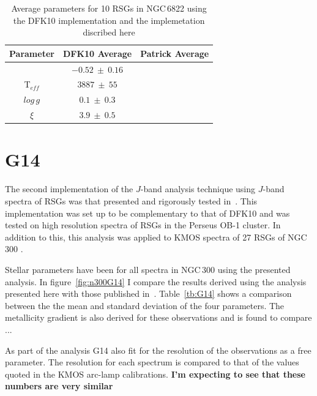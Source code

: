 \begin{table}
\caption[Parameter comparisons DFK10]{Average parameters for 10 RSGs in NGC\,6822 using the DFK10 implementation and the implemetation discribed here\label{tb:DFK10}}
\scriptsize
\begin{center}
\begin{tabular}{ccc}
 \hline
 \hline
Parameter & DFK10 Average & Patrick Average \\
 \hline
[Z]       & $-0.52~\pm~0.16$ &  \\
T$_{eff}$ & $3887~\pm~55$ &  \\
$log\,g$  & $0.1~\pm~0.3$ &  \\
$\xi$     & $3.9~\pm~0.5$ &  \\
 \hline
\end{tabular}
\end{center}
\end{table}

\section{G14} %
\label{sub:g14}
The second implementation of the $J$-band analysis technique using $J$-band spectra of RSGs was that presented and rigorously tested in~\cite{2014PhDT.........G}.
This implementation was set up to be complementary to that of DFK10 and was tested on high resolution spectra of RSGs in the Perseus OB-1 cluster.
In addition to this, this analysis was applied to KMOS spectra of 27 RSGs of NGC\,300
\citep{2015ApJ...805..182G}.

Stellar parameters have been for all spectra in NGC\,300 using the presented analysis.
In figure~\ref{fig:n300G14} I compare the results derived using the analysis presented here with those published in~\citep{2015ApJ...805..182G}.
Table~\ref{tb:G14} shows a comparison between the the mean and standard deviation of the four parameters.
The metallicity gradient is also derived for these observations and is found to compare ...

As part of the analysis G14 also fit for the resolution of the observations as a free parameter.
The resolution for each spectrum is compared to that of the values quoted in the KMOS arc-lamp calibrations.
\textbf{I'm expecting to see that these numbers are very similar}


